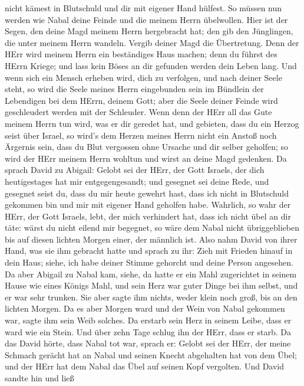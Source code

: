 nicht kämest in Blutschuld und dir mit eigener Hand hülfest. So müssen
nun werden wie Nabal deine Feinde und die meinem Herrn übelwollen.
 Hier ist der Segen, den deine Magd meinem Herrn
hergebracht hat; den gib den Jünglingen, die unter meinem Herrn wandeln.
 Vergib deiner Magd die Übertretung. Denn der HErr wird
meinem Herrn ein beständiges Haus machen; denn du führst des HErrn
Kriege; und lass kein Böses an dir gefunden werden dein Leben lang.
 Und wenn sich ein Mensch erheben wird, dich zu verfolgen,
und nach deiner Seele steht, so wird die Seele meines Herrn eingebunden
sein im Bündlein der Lebendigen bei dem HErrn, deinem Gott; aber die
Seele deiner Feinde wird geschleudert werden mit der Schleuder.
 Wenn denn der HErr all das Gute meinem Herrn tun wird, was
er dir geredet hat, und gebieten, dass du ein Herzog seist über Israel,
 so wird's dem Herzen meines Herrn nicht ein Anstoß noch
Ärgernis sein, dass du Blut vergossen ohne Ursache und dir selber
geholfen; so wird der HErr meinem Herrn wohltun und wirst an deine Magd
gedenken.  Da sprach David zu Abigail: Gelobt sei der HErr,
der Gott Israels, der dich heutigestages hat mir entgegengesandt;
 und gesegnet sei deine Rede, und gesegnet seist du, dass
du mir heute gewehrt hast, dass ich nicht in Blutschuld gekommen bin und
mir mit eigener Hand geholfen habe.  Wahrlich, so wahr der
HErr, der Gott Israels, lebt, der mich verhindert hat, dass ich nicht
übel an dir täte: wärst du nicht eilend mir begegnet, so wäre dem Nabal
nicht übriggeblieben bis auf diesen lichten Morgen einer, der männlich
ist.  Also nahm David von ihrer Hand, was sie ihm gebracht
hatte und sprach zu ihr: Zieh mit Frieden hinauf in dein Haus; siehe,
ich habe deiner Stimme gehorcht und deine Person angesehen.
 Da aber Abigail zu Nabal kam, siehe, da hatte er ein Mahl
zugerichtet in seinem Hause wie eines Königs Mahl, und sein Herz war
guter Dinge bei ihm selbst, und er war sehr trunken. Sie aber sagte ihm
nichts, weder klein noch groß, bis an den lichten Morgen. 
Da es aber Morgen ward und der Wein von Nabal gekommen war, sagte ihm
sein Weib solches. Da erstarb sein Herz in seinem Leibe, dass er ward
wie ein Stein.  Und über zehn Tage schlug ihn der HErr,
dass er starb.  Da das David hörte, dass Nabal tot war,
sprach er: Gelobt sei der HErr, der meine Schmach gerächt hat an Nabal
und seinen Knecht abgehalten hat von dem Übel; und der HErr hat dem
Nabal das Übel auf seinen Kopf vergolten. Und David sandte hin und ließ
